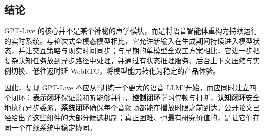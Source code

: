 \documentclass[UTF8,fontset=none,a4paper,10pt]{ctexart}
\begin{document}
\subsection{结论}

GPT-Live 的核心并不是某个神秘的声学模块，而是将语音智能体重构为持续运行的实时系统。与轮次式全模态模型相比，它允许新输入在生成期间持续进入模型状态，并让交互策略与现实时间同步；与早期的单模型全双工方案相比，它进一步把复杂认知任务放到异步路径中处理，并通过有状态推理服务、后台上下文压缩与实例切换、低往返时延 WebRTC，将模型能力转化为稳定的产品体验。

因此，复现 GPT-Live 不应从“训练一个更大的语音 LLM”开始，而应同时建立四个闭环：\textbf{表示闭环}保证说和听能够并行，\textbf{控制闭环}学习停顿与打断，\textbf{认知闭环}安全地执行异步委派，\textbf{系统闭环}确保每个音频帧都能在播放时限之前到达。公开论文已经给出了这些组件的大部分候选机制；真正困难、也最有研究价值的，是让它们在同一个在线系统中稳定协同。
\end{document}
